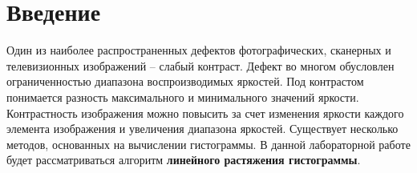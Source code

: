 \section*{Введение}
Один из наиболее распространенных дефектов фотографических, сканерных и телевизионных изображений – слабый контраст. Дефект во многом обусловлен ограниченностью диапазона воспроизводимых яркостей. Под контрастом понимается разность максимального и минимального значений яркости. Контрастность изображения можно повысить за счет изменения яркости каждого элемента изображения и увеличения диапазона яркостей. Существует несколько методов, основанных на вычислении гистограммы. В данной лабораторной работе будет рассматриваться алгоритм \textbf{линейного растяжения гистограммы}.